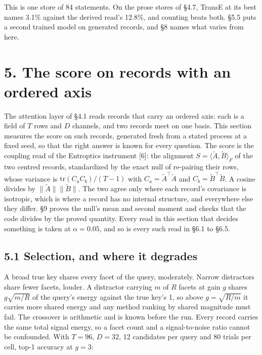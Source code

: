 \documentclass[10pt,letterpaper,twocolumn]{article}
\begin{document}
This is one store of 84 statements. On the prose stores of §4.7, TransE at its best names 3.1\%
against the derived read's 12.8\%, and counting beats both. §5.5 puts a second trained model on
generated records, and §8 names what varies from here.

\section{5. The score on records with an ordered axis}\label{5-the-score-on-records-with-an-ordered-axis}

The attention layer of §4.1 reads records that carry an ordered axis: each is a field of \(T\) rows
and \(D\) channels, and two records meet on one basis. This section measures the score on such
records, generated fresh from a stated process at a fixed seed, so that the right answer is known for
every question. The score is the coupling read of the Entroptics instrument {[}6{]}: the alignment
\(S = \langle \tilde{A}, \tilde{B} \rangle_F\) of the two centred records, standardized by the exact
null of re-pairing their rows, whose variance is \(\mathrm{tr}(C_a C_b)/(T-1)\) with
\(C_a = \tilde{A}^\top \tilde{A}\) and \(C_b = \tilde{B}^\top \tilde{B}\). A cosine divides by
\(\|\tilde{A}\| \|\tilde{B}\|\). The two agree only where each record's covariance is isotropic, which
is where a record has no internal structure, and everywhere else they differ. §9 proves the null's
mean and second moment and checks that the code divides by the proved quantity. Every read in this
section that decides something is taken at \(\alpha = 0.05\), and so is every such read in §6.1 to
§6.5.

\subsection{5.1 Selection, and where it degrades}\label{51-selection-and-where-it-degrades}

A broad true key shares every facet of the query, moderately. Narrow distractors share fewer facets,
louder. A distractor carrying \(m\) of \(R\) facets at gain \(g\) shares \(g\sqrt{m/R}\) of the query's
energy against the true key's 1, so above \(g = \sqrt{R/m}\) it carries more shared energy and any
method ranking by shared magnitude must fail. The crossover is arithmetic and is known before the
run. Every record carries the same total signal energy, so a facet count and a signal-to-noise ratio
cannot be confounded. With \(T = 96\), \(D = 32\), 12 candidates per query and 80 trials per cell,
top-1 accuracy at \(g = 3\):
\end{document}
